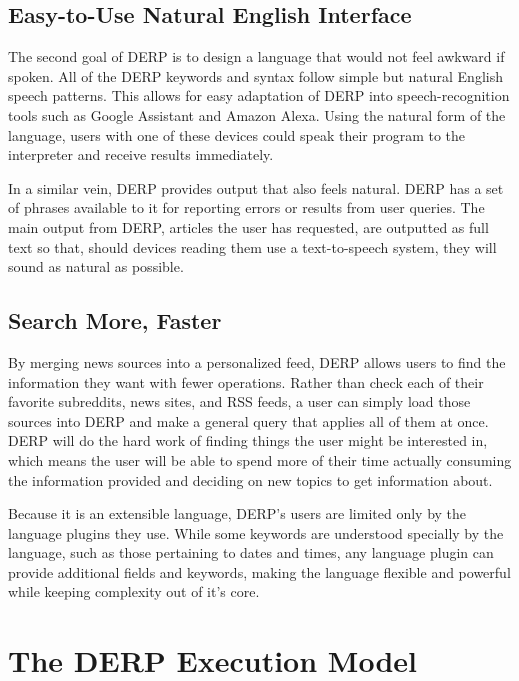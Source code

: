 \documentclass{article}
\begin{document}
\subsection{Easy-to-Use Natural English Interface}
The second goal of DERP is to design a language that would not feel awkward if spoken. All of the DERP keywords and syntax follow simple but natural English speech patterns. This allows for easy adaptation of DERP into speech-recognition tools such as Google Assistant and Amazon Alexa. Using the natural form of the language, users with one of these devices could speak their program to the interpreter and receive results immediately.

In a similar vein, DERP provides output that also feels natural.
DERP has a set of phrases available to it for reporting errors or results from user queries. The main output from DERP, articles the user has requested, are outputted as full text so that, should devices reading them use a text-to-speech system, they will sound as natural as possible.

\subsection{Search More, Faster}
By merging news sources into a personalized feed, DERP allows users to find the information they want with fewer operations. Rather than check each of their favorite subreddits, news sites, and RSS feeds, a user can simply load those sources into DERP and make a general query that applies all of them at once. DERP will do the hard work of finding things the user might be interested in, which means the user will be able to spend more of their time actually consuming the information provided and deciding on new topics to get information about.

Because it is an extensible language, DERP's users are limited only by the language plugins they use. While some keywords are understood specially by the language, such as those pertaining to dates and times, any language plugin can provide additional fields and keywords, making the language flexible and powerful while keeping complexity out of it's core.


\newpage
\section{\textbf{The DERP Execution Model}}



\end{document}
